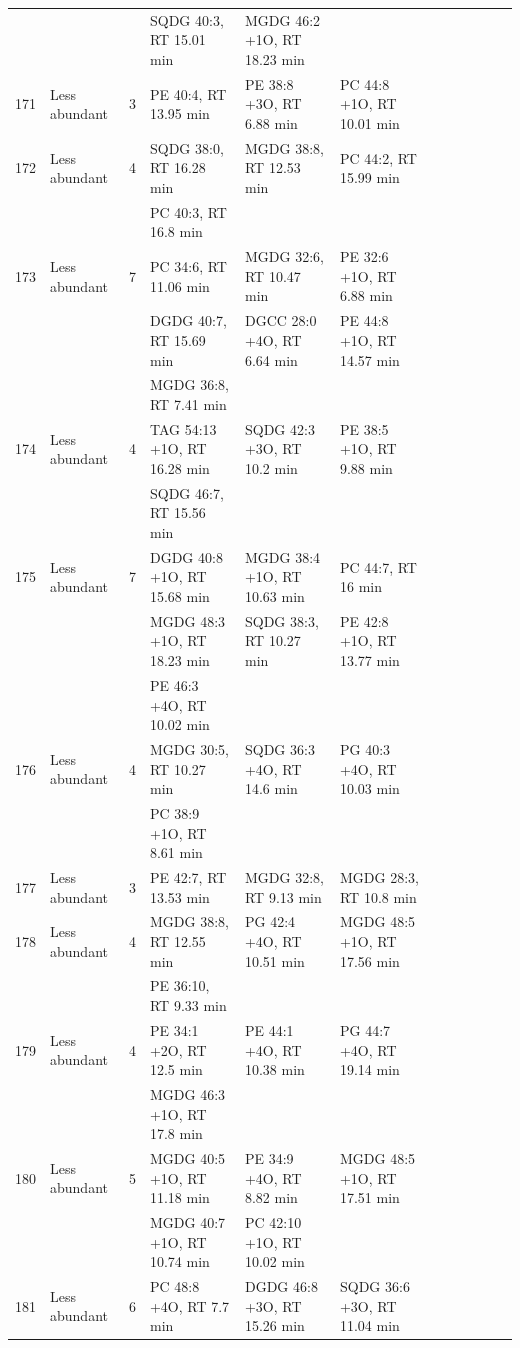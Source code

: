 \begin{landscape}
\begin{footnotesize}
\begin{singlespace}
\begin{flushleft}
\begin{longtable}{ Lp{.03\linewidth} Lp{.12\linewidth} Lp{.03\linewidth} Lp{.24\linewidth} Lp{.24\linewidth} Lp{.24\linewidth} }
 &  &  & SQDG 40:3, RT 15.01 min & MGDG 46:2 +1O, RT 18.23 min &  \\
171 & Less abundant & 3 & PE 40:4, RT 13.95 min & PE 38:8 +3O, RT 6.88 min & PC 44:8 +1O, RT 10.01 min \\
172 & Less abundant & 4 & SQDG 38:0, RT 16.28 min & MGDG 38:8, RT 12.53 min & PC 44:2, RT 15.99 min \\
 &  &  & PC 40:3, RT 16.8 min &  &  \\
173 & Less abundant & 7 & PC 34:6, RT 11.06 min & MGDG 32:6, RT 10.47 min & PE 32:6 +1O, RT 6.88 min \\
 &  &  & DGDG 40:7, RT 15.69 min & DGCC 28:0 +4O, RT 6.64 min & PE 44:8 +1O, RT 14.57 min \\
 &  &  & MGDG 36:8, RT 7.41 min &  &  \\
174 & Less abundant & 4 & TAG 54:13 +1O, RT 16.28 min & SQDG 42:3 +3O, RT 10.2 min & PE 38:5 +1O, RT 9.88 min \\
 &  &  & SQDG 46:7, RT 15.56 min &  &  \\
175 & Less abundant & 7 & DGDG 40:8 +1O, RT 15.68 min & MGDG 38:4 +1O, RT 10.63 min & PC 44:7, RT 16 min \\
 &  &  & MGDG 48:3 +1O, RT 18.23 min & SQDG 38:3, RT 10.27 min & PE 42:8 +1O, RT 13.77 min \\
 &  &  & PE 46:3 +4O, RT 10.02 min &  &  \\
176 & Less abundant & 4 & MGDG 30:5, RT 10.27 min & SQDG 36:3 +4O, RT 14.6 min & PG 40:3 +4O, RT 10.03 min \\
 &  &  & PC 38:9 +1O, RT 8.61 min &  &  \\
177 & Less abundant & 3 & PE 42:7, RT 13.53 min & MGDG 32:8, RT 9.13 min & MGDG 28:3, RT 10.8 min \\
178 & Less abundant & 4 & MGDG 38:8, RT 12.55 min & PG 42:4 +4O, RT 10.51 min & MGDG 48:5 +1O, RT 17.56 min \\
 &  &  & PE 36:10, RT 9.33 min &  &  \\
179 & Less abundant & 4 & PE 34:1 +2O, RT 12.5 min & PE 44:1 +4O, RT 10.38 min & PG 44:7 +4O, RT 19.14 min \\
 &  &  & MGDG 46:3 +1O, RT 17.8 min &  &  \\
180 & Less abundant & 5 & MGDG 40:5 +1O, RT 11.18 min & PE 34:9 +4O, RT 8.82 min & MGDG 48:5 +1O, RT 17.51 min \\
 &  &  & MGDG 40:7 +1O, RT 10.74 min & PC 42:10 +1O, RT 10.02 min &  \\
181 & Less abundant & 6 & PC 48:8 +4O, RT 7.7 min & DGDG 46:8 +3O, RT 15.26 min & SQDG 36:6 +3O, RT 11.04 min \\

\end{longtable}
\end{flushleft}
\end{singlespace}
\end{footnotesize}
\end{landscape}
